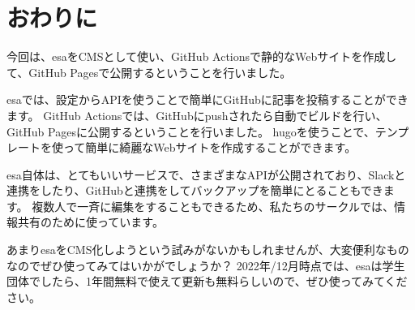 \chapter{おわりに}

今回は、esaをCMSとして使い、GitHub Actionsで静的なWebサイトを作成して、GitHub Pagesで公開するということを行いました。

esaでは、設定からAPIを使うことで簡単にGitHubに記事を投稿することができます。
GitHub Actionsでは、GitHubにpushされたら自動でビルドを行い、GitHub Pagesに公開するということを行いました。
hugoを使うことで、テンプレートを使って簡単に綺麗なWebサイトを作成することができます。

esa自体は、とてもいいサービスで、さまざまなAPIが公開されており、Slackと連携をしたり、GitHubと連携をしてバックアップを簡単にとることもできます。
複数人で一斉に編集をすることもできるため、私たちのサークルでは、情報共有のために使っています。

あまりesaをCMS化しようという試みがないかもしれませんが、大変便利なものなのでぜひ使ってみてはいかがでしょうか？
2022年/12月時点では、esaは学生団体でしたら、1年間無料で使えて更新も無料らしいので、ぜひ使ってみてください。

